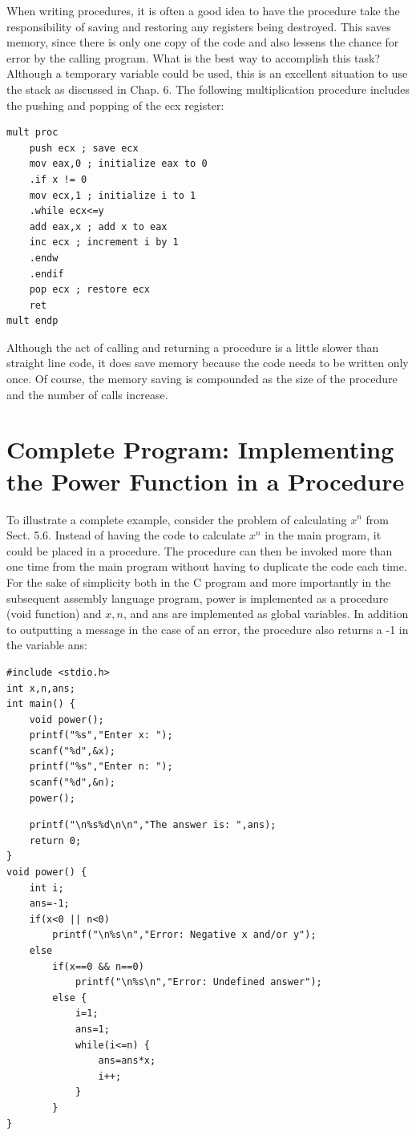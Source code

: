 \documentclass[10pt]{book}
\begin{document}
When writing procedures, it is often a good idea to have the procedure take the responsibility of saving and restoring any registers being destroyed. This saves memory, since there is only one copy of the code and also lessens the chance for error by the calling program. What is the best way to accomplish this task? Although a temporary variable could be used, this is an excellent situation to use the stack as discussed in Chap. 6. The following multiplication procedure includes the pushing and popping of the ecx register:

\begin{verbatim}
mult proc
    push ecx ; save ecx
    mov eax,0 ; initialize eax to 0
    .if x != 0
    mov ecx,1 ; initialize i to 1
    .while ecx<=y
    add eax,x ; add x to eax
    inc ecx ; increment i by 1
    .endw
    .endif
    pop ecx ; restore ecx
    ret
mult endp
\end{verbatim}

Although the act of calling and returning a procedure is a little slower than straight line code, it does save memory because the code needs to be written only once. Of course, the memory saving is compounded as the size of the procedure and the number of calls increase.
\section{Complete Program: Implementing the Power Function in a Procedure}
To illustrate a complete example, consider the problem of calculating $x^{n}$ from Sect. 5.6. Instead of having the code to calculate $x^{n}$ in the main program, it could be placed in a procedure. The procedure can then be invoked more than one time from the main program without having to duplicate the code each time. For the sake of simplicity both in the C program and more importantly in the subsequent assembly language program, power is implemented as a procedure (void function) and $x, n$, and ans are implemented as global variables. In addition to outputting a message in the case of an error, the procedure also returns a -1 in the variable ans:

\begin{verbatim}
#include <stdio.h>
int x,n,ans;
int main() {
    void power();
    printf("%s","Enter x: ");
    scanf("%d",&x);
    printf("%s","Enter n: ");
    scanf("%d",&n);
    power();
\end{verbatim}

\begin{verbatim}
    printf("\n%s%d\n\n","The answer is: ",ans);
    return 0;
}
void power() {
    int i;
    ans=-1;
    if(x<0 || n<0)
        printf("\n%s\n","Error: Negative x and/or y");
    else
        if(x==0 && n==0)
            printf("\n%s\n","Error: Undefined answer");
        else {
            i=1;
            ans=1;
            while(i<=n) {
                ans=ans*x;
                i++;
            }
        }
}
\end{verbatim}
\end{document}
